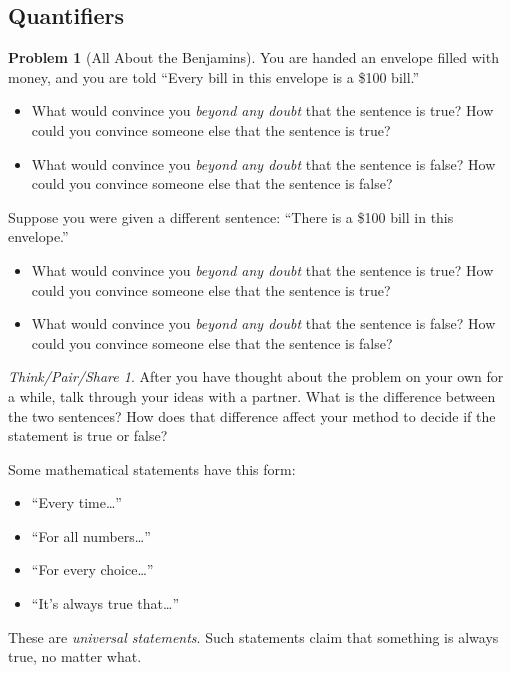 \documentclass[10pt, reqno]{amsart}
\theoremstyle{remark}
\newtheorem*{thinkpair*}{Think/Pair/Share}
\theoremstyle{definition}
\newtheorem{problem}{Problem}
\numberwithin{equation}{section}  %
\begin{document}
\subsection{Quantifiers}
\begin{problem}[All About the Benjamins]
You are handed an envelope filled with money, and you are told ``Every bill in this envelope is a \$100 bill.''
\begin{itemize}
\item
What would convince you \emph{beyond any doubt} that the sentence is true?  How could you convince someone else that the sentence is true?

\item 
What would convince you \emph{beyond any doubt} that the sentence is false?  How could you convince someone else that the sentence is false?
\end{itemize}

Suppose you were given a different sentence: ``There is a \$100 bill in this envelope.''
\begin{itemize}
\item
What would convince you \emph{beyond any doubt} that the sentence is true?  How could you convince someone else that the sentence is true?

\item 
What would convince you \emph{beyond any doubt} that the sentence is false?  How could you convince someone else that the sentence is false?
\end{itemize}
\end{problem}

\begin{thinkpair*}
After you have thought about the problem on your own for a while, talk through your ideas with a partner.  What is the difference between the two sentences?  How does that difference affect your method to decide if the statement is true or false?
\end{thinkpair*}

Some mathematical statements have this form:
\begin{itemize}
\item
``Every time\dots''
\item
``For all numbers\dots''
\item
``For every choice\dots''
\item
``It's always true that\dots''
\end{itemize} 
These are \emph{universal statements}.  Such statements claim that something is always true, no matter what.  
\end{document}

